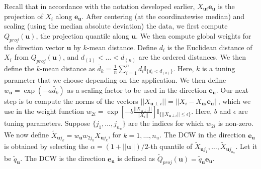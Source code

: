 \documentclass[twoside]{article}
\newcommand{\mbfeu}{\mathbf{e}_{\mathbf u} }
\begin{document}
 Recall that in accordance with the notation developed 
 earlier, $X_{\mathbf{u} i} \mbfeu$ is the projection of $X_{i}$ along 
 $\mbfeu$.  After centering (at the coordinatewise median) and scaling (using the 
 median absolute deviation) the data, we first compute 
 $Q_{proj}( \mathbf{u} )$, the projection quantile along $\mathbf{u}$. 
We then compute global weights for the direction vector $\mathbf{u}$ by $k$-mean 
distance. Define $d_i$ is the Euclidean distance of $X_i$ from 
$Q_{proj} (\mathbf{u})$, and $d_{(1)} < \ldots < d_{(n)}$ are the ordered distances. 
We then define the $k$-mean distance as
$\bar{d}_k = \frac{1}{n} \sum_{i = 1}^n d_i \mathbb{I}_{ \{d_i < d_{(k)} \} }$.
Here, $k$ is a tuning parameter that we choose depending on the application. 
We then define $w_{\mathbf{u}} = \exp (- a \bar{d}_k)$ as a scaling  factor to be used 
in the direction $\mbfeu$. 
Our next step is to compute the norms of the vectors 
 $|| X_{\mathbf{u} \perp i} || = || X_i - X_{\mathbf{u} i} \mbfeu ||$, 
 which we use in the weight function
$ w_{2i} = 
\exp \left[ -b \frac{ || X_{\mathbf{u} \perp i}||}{ || X_i ||} \right] 
\mathbb{I}_{ \{ || X_{\mathbf{u} \perp i} || \leq \epsilon \}}$. 
Here, $b$ and $\epsilon$ are tuning parameters.
Suppose $\{ j_{1}, \ldots, j_{n_{u}} \}$ are the indices for which $w_{2 i}$ is non-zero. 
We now define $\tilde X_{\mathbf{u} j_{k}} = 
w_{\mathbf{u}} w_{2 j_{k}} X_{\mathbf{u} j_{k}}$, 
for $k = 1, \ldots, n_{u}$.
The DCW in the direction $\mbfeu$ is obtained by selecting the 
$\alpha = (1 + ||\mathbf{u} ||)/2$-th quantile of 
$\tilde X_{\mathbf{u} j_{1}}, \ldots, \tilde X_{\mathbf{u} j_{n_{u}}}$. 
Let it be $\tilde{q}_\mathbf{u}$. The DCW is the direction $\mbfeu$ is defined as 
$\tilde Q_{proj} (\mathbf{u}) = \tilde{q}_\mathbf{u} \mbfeu$.
\end{document}
